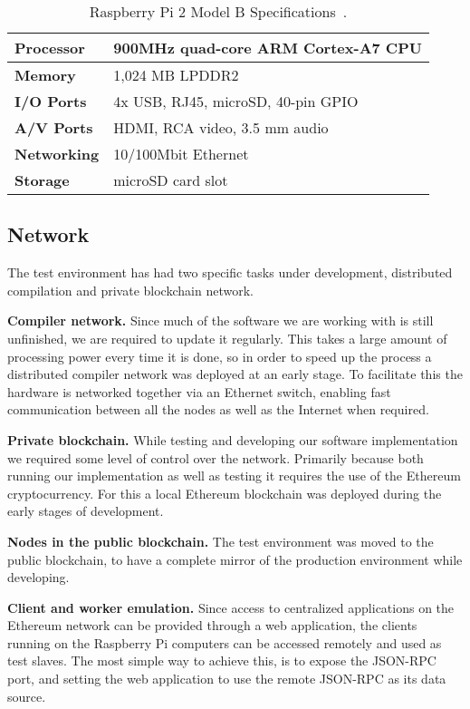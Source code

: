 \begin{table}[h]
\centering
\caption{Raspberry Pi 2 Model B Specifications~\cite{rpi}.}
\label{rpi}
\begin{tabular}{|l|l|}
\hline \textbf{Processor} & 900MHz quad-core ARM Cortex-A7 CPU \\ \hline
\textbf{Memory} & 1,024 MB LPDDR2 \\ \hline 
\textbf{I/O Ports} & 4x USB, RJ45, microSD, 40-pin GPIO \\ \hline
\textbf{A/V Ports} & HDMI, RCA video, 3.5 mm audio \\ \hline
\textbf{Networking} & 10/100Mbit Ethernet \\ \hline
\textbf{Storage} & microSD card slot \\ \hline
\end{tabular}
\end{table}

\subsection{Network}
The test environment has had two specific tasks under development, distributed compilation and private blockchain network.

\textbf{Compiler network.} Since much of the software we are working with is still unfinished, we are required to update it regularly. This takes a large amount of processing power every time it is done, so in order to speed up the process a distributed compiler network was deployed at an early stage. To facilitate this the hardware is networked together via an Ethernet switch, enabling fast communication between all the nodes as well as the Internet when required. 

\textbf{Private blockchain.} While testing and developing our software implementation we required some level of control over the network. Primarily because both running our implementation as well as testing it requires the use of the Ethereum cryptocurrency. For this a local Ethereum blockchain was deployed during the early stages of development.

\textbf{Nodes in the public blockchain.} The test environment was moved to the public blockchain, to have a complete mirror of the production environment while developing.

\textbf{Client and worker emulation.} Since access to centralized applications on the Ethereum network can be provided through a web application, the clients running on the Raspberry Pi computers can be accessed remotely and used as test slaves. The most simple way to achieve this, is to expose the JSON-RPC port, and setting the web application to use the remote JSON-RPC as its data source.
